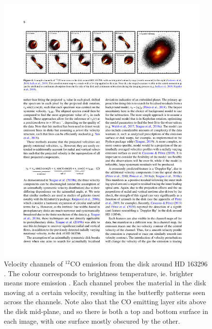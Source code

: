 \begin{figure}
    \centering
    \includegraphics[width = 0.95\textwidth]{figures/channels.pdf}
    \caption{Velocity channels of $^{12}$CO emission from the disk around HD 163296 \citep{andrews2018}. The colour corresponds to brightness temperature, ie. brighter means more emission \citep{diskdynamicscollaboration2020}. Each channel probes the material in the disk moving at a certain velocity, resulting in the butterfly patterns seen across the channels. Note also that the CO emitting layer sits above the disk mid-plane, and so there is both a top and bottom surface in each image, with one surface mostly obscured by the other.}
    \label{fig:channels}
\end{figure}

